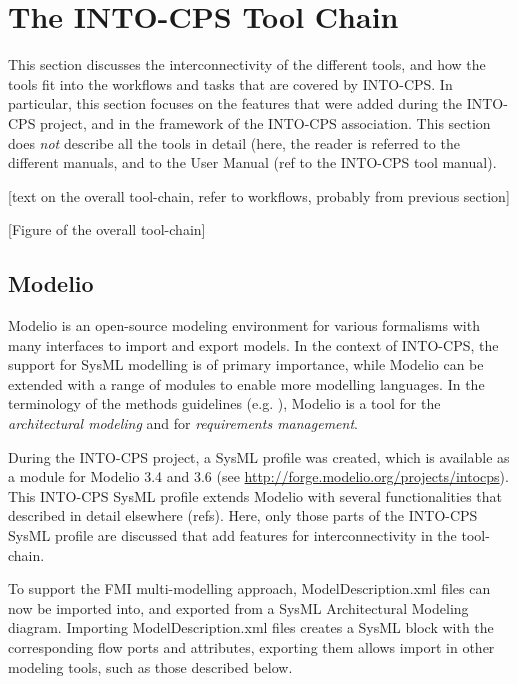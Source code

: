 
\section{The INTO-CPS Tool Chain}\label{sec:toolchain}




This section discusses the interconnectivity of the different tools, and how the tools fit into the workflows and tasks that are covered by INTO-CPS. In particular, this section focuses on the features that were added during the INTO-CPS project, and in the framework of the INTO-CPS association. This section does \textit{not} describe all the tools in detail (here, the reader is referred to the different manuals, and to the User Manual (ref to the INTO-CPS tool manual).

[text on the overall tool-chain, refer to workflows, probably from previous section]

[Figure of the overall tool-chain]

\subsection{Modelio}

Modelio is an open-source modeling environment for various formalisms with many interfaces to import and export models. In the context of INTO-CPS, the support for SysML modelling is of primary importance, while Modelio can be extended with a range of modules to enable more modelling languages. In the terminology of the methods guidelines (e.g. \cite{INTOCPSD3.3a}), Modelio is a tool for the \textit{architectural modeling} and for \textit{requirements management}.

During the INTO-CPS project, a SysML profile was created, which is available as a module for Modelio 3.4 and 3.6 (see \url{http://forge.modelio.org/projects/intocps}). This INTO-CPS SysML profile extends Modelio with several functionalities that described in detail elsewhere (refs). Here, only those parts of the INTO-CPS SysML profile are discussed that add features for interconnectivity in the tool-chain.

To support the FMI multi-modelling approach, ModelDescription.xml files can now be imported into, and exported from a SysML Architectural Modeling diagram. Importing ModelDescription.xml files creates a SysML block with the corresponding flow ports and attributes, exporting them allows import in other modeling tools, such as those described below.

